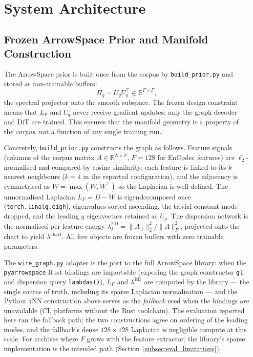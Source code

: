 \documentclass[12pt,a4paper]{article}
\begin{document}
\section{System Architecture}
\label{sec:architecture}

\subsection{Frozen ArrowSpace Prior and Manifold Construction}
\label{subsec:arch_prior}

The ArrowSpace prior is built once from the corpus by \texttt{build\_prior.py}
and stored as non-trainable buffers:
\begin{equation}
  \Pi_q = U_q U_q^\top \in \mathbb{R}^{F \times F},
  \label{eq:projector}
\end{equation}
the spectral projector onto the smooth subspace. The frozen design
constraint means that $L_F$ and $U_q$ never receive gradient updates;
only the graph decoder and DiT are trained. This ensures that the
manifold geometry is a property of the \emph{corpus}, not a function of
any single training run.

Concretely, \texttt{build\_prior.py} constructs the graph as follows.
Feature signals (columns of the corpus matrix $A \in \mathbb{R}^{N
\times F}$, $F{=}128$ for EnCodec features) are $\ell_2$-normalised and
compared by cosine similarity; each feature is linked to its $k$ nearest
neighbours ($k{=}4$ in the reported configuration), and the adjacency is
symmetrised as $W = \max(W, W^\top)$ so the Laplacian is well-defined.
The unnormalised Laplacian $L_F = D - W$ is eigendecomposed once
(\texttt{torch.linalg.eigh}), eigenvalues sorted ascending, the trivial
constant mode dropped, and the leading $q$ eigenvectors retained as
$U_q$. The dispersion network is the normalised per-feature energy
$\lambda^{\mathrm{ED}}_f = \lVert A_{\cdot f} \rVert_2^2 /
\lVert A \rVert_F^2$, projected onto the chart to yield
$\lambda^{\mathrm{chart}}$. All five objects are frozen buffers with
zero trainable parameters.

The \texttt{wire\_graph.py} adapter is the port to the full ArrowSpace
library: when the \texttt{pyarrowspace} Rust bindings are importable
(exposing the graph constructor \texttt{gl} and dispersion query
\texttt{lambdas()}), $L_F$ and $\lambda^{\mathrm{ED}}$ are computed by
the library — the single source of truth, including its sparse
Laplacian normalisation — and the Python kNN construction above serves
as the \emph{fallback} used when the bindings are unavailable (CI,
platforms without the Rust toolchain). The evaluation reported here ran
the fallback path; the two constructions agree on ordering of the
leading modes, and the fallback's dense $128\times128$ Laplacian is
negligible compute at this scale. For archives where $F$ grows with the
feature extractor, the library's sparse implementation is the intended
path (Section~\ref{subsec:eval_limitations}).
\end{document}

